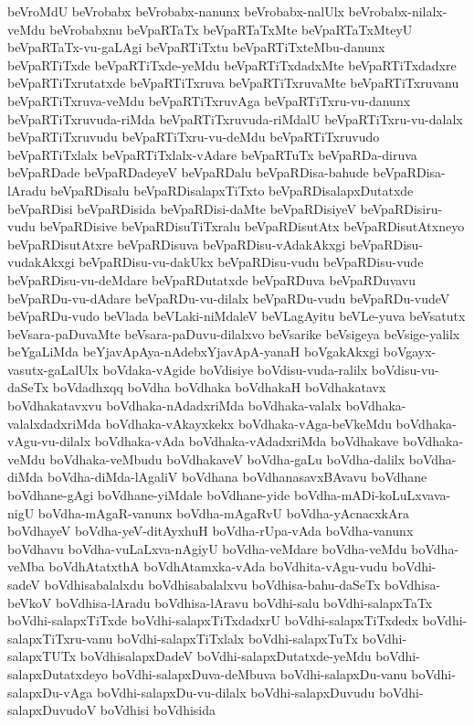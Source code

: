 {beVroMdU
beVrobabx
beVrobabx-nanunx
beVrobabx-nalUlx
beVrobabx-nilalx-veMdu
beVrobabxnu
beVpaRTaTx
beVpaRTaTxMte
beVpaRTaTxMteyU
beVpaRTaTx-vu-gaLAgi
beVpaRTiTxtu
beVpaRTiTxteMbu-danunx
beVpaRTiTxde
beVpaRTiTxde-yeMdu
beVpaRTiTxdadxMte
beVpaRTiTxdadxre
beVpaRTiTxrutatxde
beVpaRTiTxruva
beVpaRTiTxruvaMte
beVpaRTiTxruvanu
beVpaRTiTxruva-veMdu
beVpaRTiTxruvAga
beVpaRTiTxru-vu-danunx
beVpaRTiTxruvuda-riMda
beVpaRTiTxruvuda-riMdalU
beVpaRTiTxru-vu-dalalx
beVpaRTiTxruvudu
beVpaRTiTxru-vu-deMdu
beVpaRTiTxruvudo
beVpaRTiTxlalx
beVpaRTiTxlalx-vAdare
beVpaRTuTx
beVpaRDa-diruva
beVpaRDade
beVpaRDadeyeV
beVpaRDalu
beVpaRDisa-bahude
beVpaRDisa-lAradu
beVpaRDisalu
beVpaRDisalapxTiTxto
beVpaRDisalapxDutatxde
beVpaRDisi
beVpaRDisida
beVpaRDisi-daMte
beVpaRDisiyeV
beVpaRDisiru-vudu
beVpaRDisive
beVpaRDisuTiTxralu
beVpaRDisutAtx
beVpaRDisutAtxneyo
beVpaRDisutAtxre
beVpaRDisuva
beVpaRDisu-vAdakAkxgi
beVpaRDisu-vudakAkxgi
beVpaRDisu-vu-dakUkx
beVpaRDisu-vudu
beVpaRDisu-vude
beVpaRDisu-vu-deMdare
beVpaRDutatxde
beVpaRDuva
beVpaRDuvavu
beVpaRDu-vu-dAdare
beVpaRDu-vu-dilalx
beVpaRDu-vudu
beVpaRDu-vudeV
beVpaRDu-vudo
beVlada
beVLaki-niMdaleV
beVLagAyitu
beVLe-yuva
beVsatutx
beVsara-paDuvaMte
beVsara-paDuvu-dilalxvo
beVsarike
beVsigeya
beVsige-yalilx
beYgaLiMda
beYjavApAya-nAdebxYjavApA-yanaH
boVgakAkxgi
boVgayx-vasutx-gaLalUlx
boVdaka-vAgide
boVdisiye
boVdisu-vuda-ralilx
boVdisu-vu-daSeTx
boVdadhxqq
boVdha
boVdhaka
boVdhakaH
boVdhakatavx
boVdhakatavxvu
boVdhaka-nAdadxriMda
boVdhaka-valalx
boVdhaka-valalxdadxriMda
boVdhaka-vAkayxkekx
boVdhaka-vAga-beVkeMdu
boVdhaka-vAgu-vu-dilalx
boVdhaka-vAda
boVdhaka-vAdadxriMda
boVdhakave
boVdhaka-veMdu
boVdhaka-veMbudu
boVdhakaveV
boVdha-gaLu
boVdha-dalilx
boVdha-diMda
boVdha-diMda-lAgaliV
boVdhana
boVdhanasavxBAvavu
boVdhane
boVdhane-gAgi
boVdhane-yiMdale
boVdhane-yide
boVdha-mADi-koLuLxvava-nigU
boVdha-mAgaR-vanunx
boVdha-mAgaRvU
boVdha-yAcnacxkAra
boVdhayeV
boVdha-yeV-ditAyxhuH
boVdha-rUpa-vAda
boVdha-vanunx
boVdhavu
boVdha-vuLaLxva-nAgiyU
boVdha-veMdare
boVdha-veMdu
boVdha-veMba
boVdhAtatxthA
boVdhAtamxka-vAda
boVdhita-vAgu-vudu
boVdhi-sadeV
boVdhisabalalxdu
boVdhisabalalxvu
boVdhisa-bahu-daSeTx
boVdhisa-beVkoV
boVdhisa-lAradu
boVdhisa-lAravu
boVdhi-salu
boVdhi-salapxTaTx
boVdhi-salapxTiTxde
boVdhi-salapxTiTxdadxrU
boVdhi-salapxTiTxdedx
boVdhi-salapxTiTxru-vanu
boVdhi-salapxTiTxlalx
boVdhi-salapxTuTx
boVdhi-salapxTUTx
boVdhisalapxDadeV
boVdhi-salapxDutatxde-yeMdu
boVdhi-salapxDutatxdeyo
boVdhi-salapxDuva-deMbuva
boVdhi-salapxDu-vanu
boVdhi-salapxDu-vAga
boVdhi-salapxDu-vu-dilalx
boVdhi-salapxDuvudu
boVdhi-salapxDuvudoV
boVdhisi
boVdhisida
}
